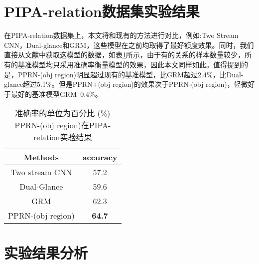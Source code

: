 \section{PIPA-relation数据集实验结果}

在PIPA-relation数据集上，本文将和现有的方法进行对比，例如:Two Stream CNN\cite{sun2017a}，Dual-glance\cite{li2017dual-glance}和GRM\cite{wang2018deep}，这些模型在之前均取得了最好额度效果。同时，我们直接从文献中获取这模型的数据，如表\ref{tab:exp-pipa-table}所示，由于有的关系的样本数量较少，所有的基准模型均只采用准确率衡量模型的效果，因此本文同样如此。值得提到的是，PPRN-(obj region)明显超过现有的基准模型，比GRM超过2.4\%，比Dual-glance超过5.1\%。但是PPRN+(obj region)的效果次于PPRN-(obj region)，轻微好于最好的基准模型GRM~0.4\%。
\begin{table}[htpb]
  \centering
  \caption{准确率的单位为百分比 (\%) PPRN-(obj region)在PIPA-relation实验结果}
   \vspace*{-3.5pt}
  \label{tab:exp-pipa-table}
  \begin{tabular}{c|c}
    \toprule
    Methods & accuracy \\
    \midrule
    Two stream CNN \cite{zhang2015beyond} & 57.2 \\
    \midrule
    Dual-Glance \cite{li2017dual-glance} & 59.6 \\
    \midrule
    GRM \cite{wang2018deep} & 62.3 \\
    \midrule
    PPRN-(obj region) & \textbf{64.7} \\
    \bottomrule
  \end{tabular}
\end{table}

\section{实验结果分析}

